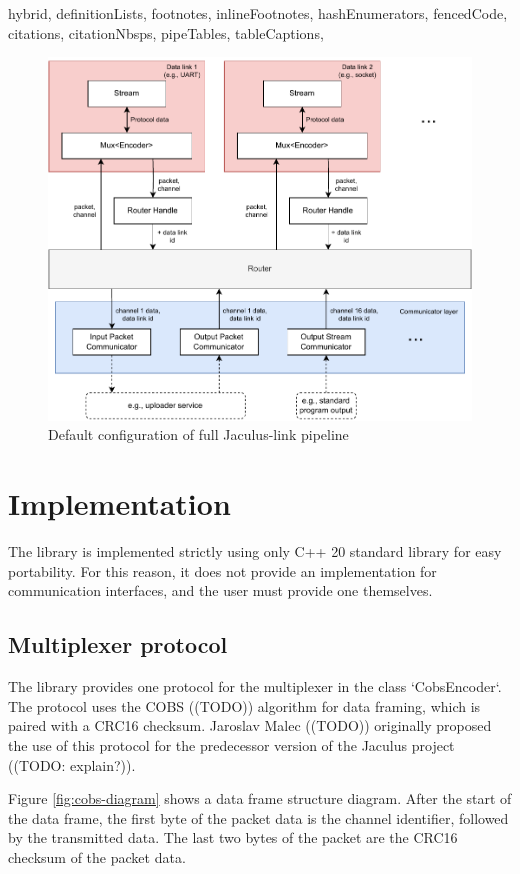 \begin{markdown*}{%
  hybrid,
  definitionLists,
  footnotes,
  inlineFootnotes,
  hashEnumerators,
  fencedCode,
  citations,
  citationNbsps,
  pipeTables,
  tableCaptions,
}
\begin{figure}[!ht]
    \centering
    \includegraphics[width=\textwidth]{img/link-pipeline}
    \caption{Default configuration of full Jaculus-link pipeline}
    \label{fig:link-pipeline}
\end{figure}


\section{Implementation}

The library is implemented strictly using only C++ 20 standard library for easy portability. For this reason, it does not provide an implementation for communication interfaces, and the user must provide one themselves.

\subsection{Multiplexer protocol}

The library provides one protocol for the multiplexer in the class `CobsEncoder`. The protocol uses the COBS ((TODO)) algorithm for data framing, which is paired with a CRC16 checksum. Jaroslav Malec ((TODO)) originally proposed the use of this protocol for the predecessor version of the Jaculus project ((TODO: explain?)).

Figure \ref{fig:cobs-diagram} shows a data frame structure diagram. After the start of the data frame, the first byte of the packet data is the channel identifier, followed by the transmitted data. The last two bytes of the packet are the CRC16 checksum of the packet data.


\end{markdown*}
